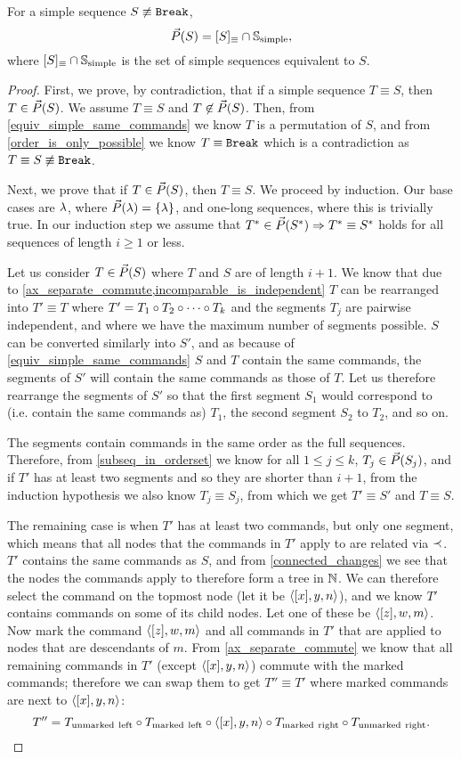 \begin{mylem}\label{simple_reorder_equiv}
For a simple sequence $S\not\equiv\mathtt{Break}$,
\[ \vec{P}({S}) = [S]_\equiv \cap \mathbb{S}_{\mathrm{simple}}, \]
where $[S]_\equiv \cap \mathbb{S}_{\mathrm{simple}}$ is the set of simple sequences equivalent to $S$.
\end{mylem}
\begin{proof}
First, we prove, by contradiction, that if a simple sequence $T\equiv S$, then $T\in\vec{P}({S})$.
We assume $T\equiv S$ and $T\not\in\vec{P}({S})$.
Then, from \cref{equiv_simple_same_commands} we know $T$ is a permutation of $S$,
and from \cref{order_is_only_possible} we know $T\equiv\mathtt{Break}$ which
is a contradiction as $T\equiv S\not\equiv\mathtt{Break}$.

Next, we prove that if $T\in\vec{P}({S})$, then $T\equiv S$.
We proceed by induction.
Our base cases are $\lambda$, where $\vec{P}({\lambda})=\{\lambda\}$,
and one-long sequences, where this is trivially true.
In our induction step we assume that $T^*\in\vec{P}({S^*})\Rightarrow T^*\equiv S^*$ holds
for all sequences of length $i\geq 1$ or less.

Let us consider $T\in\vec{P}({S})$ where $T$ and $S$ are of length $i+1$.
We know that due to \cref{ax_separate_commute,incomparable_is_independent}
$T$ can be rearranged into $T'\equiv T$ where
$T'=T_1\circ T_2\circ \cdots \circ T_k$ and the segments $T_j$ are pairwise independent,
and where we have the maximum number of segments possible.
$S$ can be converted similarly into $S'$, and
as because of \cref{equiv_simple_same_commands} $S$ and $T$ contain the same commands,
the segments of $S'$ will contain the same commands as those of $T$.
Let us therefore rearrange the segments of $S'$ so that the first segment
$S_1$ would correspond to (i.e. contain the same commands as) $T_1$, the second segment $S_2$ to $T_2$,
and so on.

The segments contain commands in the same order as the full sequences.
Therefore, from \cref{subseq_in_orderset}
we know for all $1\leq j\leq k$, $T_j\in\vec{P}({S_j})$,
and if $T'$ has at least two segments and so 
they are shorter than $i+1$,
from the induction hypothesis
we also know $T_j\equiv S_j$, from which we get $T'\equiv S'$ and $T\equiv S$.

The remaining case is when $T'$ has at least two commands,
but only one segment, which means
that all nodes that the commands in $T'$ apply to
are related via $\prec$.
$T'$ contains the same commands as $S$, and
from \cref{connected_changes} we see that the nodes the commands apply to therefore form a tree in $\mathbb{N}$.
We can therefore select the command on the topmost node (let it be $\langle{[x],y,n}\rangle$),
and we know $T'$ contains commands on some of its child nodes.
Let one of these be $\langle{[z],w,m}\rangle$.
Now mark the command $\langle{[z],w,m}\rangle$ and all commands in $T'$ that are applied to nodes that are descendants of $m$.
From \cref{ax_separate_commute} we know that all remaining commands in $T'$ (except $\langle{[x],y,n}\rangle$)
commute with the marked commands; therefore we can swap them to get $T''\equiv T'$
where marked commands are next to $\langle{[x],y,n}\rangle$:
\[ T'' = T_\mathrm{unmarked\ left} \circ T_\mathrm{marked\ left} \circ \langle{[x],y,n}\rangle \circ T_\mathrm{marked\ right} \circ T_\mathrm{unmarked\ right}. \]



\end{proof}
